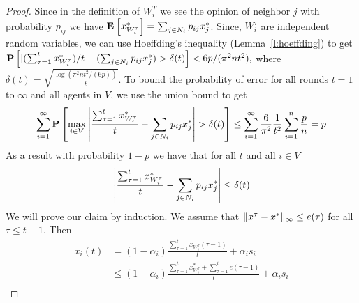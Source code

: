 \begin{proof}
  Since in the definition of $W_i^T$ we see the opinion of neighbor $j$
  with probability $p_{ij}$ we have
  \(
    \Exp{x^*_{W_i^\tau}} = \sum_{j \in N_i} p_{ij} x^*_j
  \).
  Since, $W_i^\tau$ are independent random variables,
  we can use Hoeffding's inequality (Lemma~\ref{l:hoeffding}) to get
  \(
    \bm{\mathrm{P}}\left[
      |
      {(\sum_{\tau = 1}^{t} x^*_{W_i^\tau}})/{t}
      - (\sum_{j \in N_i} p_{ij} x^*_j)
      > \delta(t)
    \right]
    < 6 p / (\pi^2 n t^2),
  \)
  where $\delta(t) = \sqrt{ \frac{\log(\pi^2 n t^2/(6 p))}{t}}$.
  To bound the probability of error for all rounds $t=1$ to $\infty$
  and all agents in $V$, we use the union bound to get
  \begin{align*}
    \sum_{i=1}^{\infty}
    \bm{\mathrm{P}}\left[ \max_{i \in V}
      \left|
      \frac{\sum_{\tau = 1}^{t} x^*_{W_i^{\tau}}}{t}
      - \sum_{j \in N_i} p_{ij} x^*_j \right|
      > \delta(t)\right]
    \leq
    \sum_{i=1}^{\infty} \frac{6}{\pi^2} \frac{1}{t^2} \sum_{i=1}^n \frac{p}{n} =
    p
  \end{align*}
  As a result with probability $1-p$ we have that for all $t$ and all $i \in V$
  \begin{equation}\label{eq:error_per_round}
    \left|
    \frac{\sum_{\tau=1}^t x^*_{W_i^\tau}}{t} -
    \sum_{j \in N_i} p_{ij} x^*_j
    \right| \leq \delta(t)
  \end{equation}
  We will prove our claim by induction.
  We assume that $\| x^{\tau}-x^* \|_{\infty} \leq e(\tau)$ for all
  $\tau \leq t-1$. Then
  \begin{align}
    x_i(t)
    &=
    (1-\alpha_i)\frac{\sum_{\tau=1}^{t}x_{W_i^{\tau}}(\tau-1)}{t}
    + \alpha_i s_i \nonumber \\
    &\leq
    (1-\alpha_i)\frac{\sum_{\tau=1}^{t}x^*_{W_i^{\tau}} +
      \sum_{\tau=1}^{t} e(\tau-1)}{t} + \alpha_i s_i \label{step:induction_step}\\

\end{align}
\end{proof}

